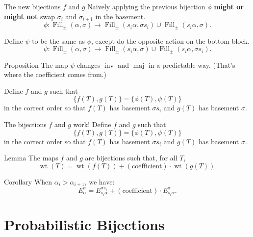 \documentclass[aspectratio = 1609]{beamer}
\theoremstyle{definition}
\theoremstyle{plain} %
\DeclareMathOperator{\wt}{wt}
\DeclareMathOperator{\maj}{maj}
\DeclareMathOperator{\inv}{inv}
\begin{document}
\begin{frame}{The new bijections \(f\) and \(g\)}
  Naively applying the previous bijection \(\phi\) \textbf{might or might not} swap \(\sigma_i\) and \(\sigma_{i+1}\) in the basement.
  \[
    \phi \colon \operatorname{Fill}_\pm(\alpha, \sigma)
    \to
    \operatorname{Fill}_\pm(s_i \alpha, \sigma s_i)
    \cup
    \operatorname{Fill}_\pm(s_i \alpha, \sigma).
  \]

  Define \(\psi\) to be the same as \(\phi\), except do the opposite action on the bottom block.
  \[
    \psi \colon \operatorname{Fill}_\pm(\alpha, \sigma)
    \to
    \operatorname{Fill}_\pm(s_i \alpha, \sigma)
    \cup
    \operatorname{Fill}_\pm(s_i \alpha, \sigma s_i).
  \]

  \begin{block}{Proposition}
    The map \(\psi\) changes \(\inv\) and \(\maj\) in a predictable way. 
    (That's where the coefficient comes from.)
  \end{block}

  \vspace{.5em}

  Define \(f\) and \(g\) such that
  \[
    \{f(T), g(T)\} = \{\phi(T), \psi(T)\}
  \]
  in the correct order so that \(f(T)\) has basement \(\sigma s_i\) and \(g(T)\) has basement \(\sigma\).
\end{frame}

\begin{frame}{The bijections \(f\) and \(g\) work!}
  Define \(f\) and \(g\) such that
  \[
    \{f(T), g(T)\} = \{\phi(T), \psi(T)\}
  \]
  in the correct order so that \(f(T)\) has basement \(\sigma s_i\) and \(g(T)\) has basement \(\sigma\).

  \begin{block}{Lemma}
    The maps \(f\) and \(g\) are bijections such that, for all \(T\),
    \[
    \wt(T) = \wt(f(T)) + (\text{coefficient}) \cdot \wt(g(T)).
    \]
  \end{block}

  \begin{block}{Corollary}
    When \(\alpha_i > \alpha_{i+1}\), we have:
    \[
      E_\alpha^\sigma = 
      E_{s_i \alpha}^{\sigma s_i} +
      (\text{coefficient}) \cdot
      E_{s_i \alpha}^\sigma.
    \]
  \end{block}
\end{frame}

\part{Probabilistic Bijections}
\end{document}
